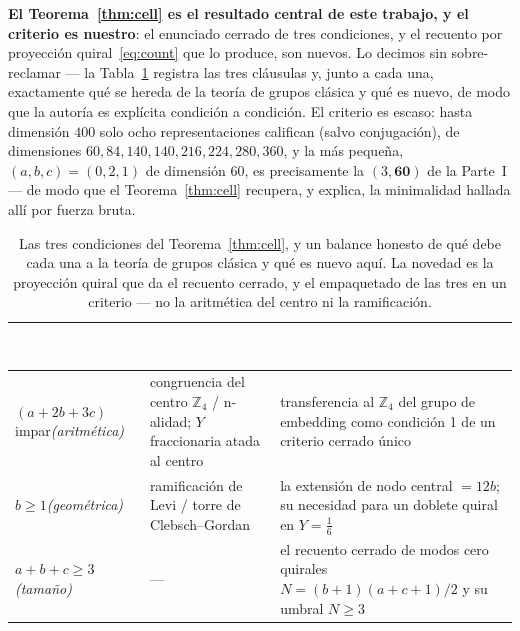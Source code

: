 \documentclass[11pt,a4paper]{article}
\newcommand{\ZZ}{\mathbb{Z}}
\begin{document}
\textbf{El Teorema~\ref{thm:cell} es el resultado central de este trabajo, y el criterio es
nuestro}: el enunciado cerrado de tres condiciones, y el recuento por proyección
quiral~\eqref{eq:count} que lo produce, son nuevos. Lo decimos sin sobre-reclamar --- la
Tabla~\ref{tab:gates} registra las tres cláusulas y, junto a cada una, exactamente qué se
hereda de la teoría de grupos clásica y qué es nuevo, de modo que la autoría es explícita
condición a condición. El criterio es escaso: hasta dimensión $400$ solo ocho representaciones
califican (salvo conjugación), de dimensiones $60,84,140,140,216,224,280,360$, y la más
pequeña, $(a,b,c)=(0,2,1)$ de dimensión $60$, es precisamente la $(3,\mathbf{60})$ de la
Parte~I --- de modo que el Teorema~\ref{thm:cell} recupera, y explica, la minimalidad hallada
allí por fuerza bruta.

\begin{table}[t]
\centering\small
\begin{tabular}{p{3.4cm}p{4.9cm}p{5.4cm}}
\toprule
\rowcolor{hdrblue}
\textcolor{white}{Condición} & \textcolor{white}{Heredado (citar)} & \textcolor{white}{Nuestro}\\
\midrule
$(a{+}2b{+}3c)$ impar\newline\emph{(aritmética)} &
congruencia del centro $\ZZ_4$ / n-alidad; $Y$ fraccionaria atada al
centro~\cite{Hucks,Saller,Tong,Alonso,Slansky} &
transferencia al $\ZZ_4$ del grupo de embedding como condición 1 de un criterio cerrado
único\\
\midrule
\rowcolor{softgrey}
$b\ge1$\newline\emph{(geométrica)} &
ramificación de Levi / torre de Clebsch--Gordan~\cite{Fulton,GW} &
la extensión de nodo central $=12b$; su necesidad para un doblete quiral en $Y=\tfrac16$\\
\midrule
$a+b+c\ge3$\newline\emph{(tamaño)} &
--- &
el recuento cerrado de modos cero quirales $N=(b{+}1)(a{+}c{+}1)/2$ y su umbral $N\ge3$\\
\bottomrule
\end{tabular}
\caption{Las tres condiciones del Teorema~\ref{thm:cell}, y un balance honesto de qué debe cada
una a la teoría de grupos clásica y qué es nuevo aquí. La novedad es la proyección quiral que da
el recuento cerrado, y el empaquetado de las tres en un criterio --- no la aritmética del centro
ni la ramificación.}
\label{tab:gates}
\end{table}
\end{document}
